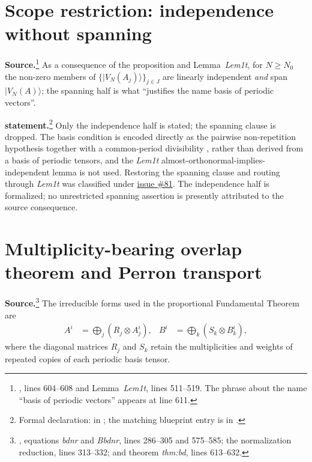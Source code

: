 \documentclass{article}
\begin{document}
\section{Scope restriction: independence without spanning}

\textbf{Source.}\footnote{\cite{DeLasCuevas2017Irreducible}, lines 604--608
and Lemma~\emph{Lem1t}, lines 511--519. The phrase about the name
``basis of periodic vectors'' appears at line 611.} As a consequence of the
proposition and Lemma~\emph{Lem1t}, for $N\ge N_0$ the non-zero members of
$\{|V_N(A_j)\rangle\}_{j\in J}$ are linearly independent \emph{and} span
$|V_N(A)\rangle$; the spanning half is what ``justifies the name basis of
periodic vectors''.

\textbf{\Lean{} statement.}\footnote{Formal declaration:
 in ;
the matching blueprint entry is in
.}
Only the independence half is stated; the spanning clause is dropped. The
basis condition is encoded directly as the pairwise non-repetition hypothesis
 together with
a common-period divisibility , rather than derived from a basis of
periodic tensors, and the \emph{Lem1t} almost-orthonormal-implies-independent
lemma is not used. Restoring the spanning clause and routing through
\emph{Lem1t} was classified under
\href{https://github.com/LionSR/TNLean/issues/81}{issue \#81}. The independence
half is formalized; no unrestricted spanning assertion is presently attributed
to the source consequence.

\section{Multiplicity-bearing overlap theorem and Perron transport}

\textbf{Source.}\footnote{\cite{DeLasCuevas2017Irreducible}, equations
\emph{bdnr} and \emph{Bbdnr}, lines 286--305 and 575--585; the normalization
reduction, lines 313--332; and theorem \emph{thm:bd}, lines 613--632.} The
irreducible forms used in the proportional Fundamental Theorem are
\begin{align}
  A^i&=\bigoplus_j (R_j\otimes A_j^i),&
  B^i&=\bigoplus_k (S_k\otimes B_k^i),
\end{align}
where the diagonal matrices $R_j$ and $S_k$ retain the multiplicities and
weights of repeated copies of each periodic basis tensor.
\end{document}
